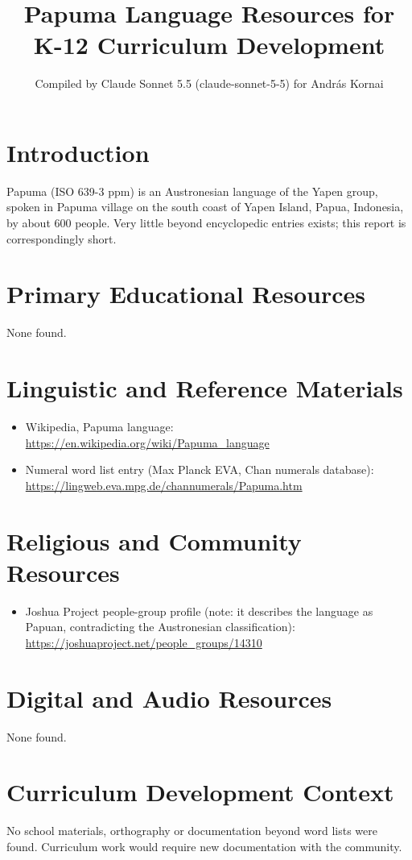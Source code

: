 \documentclass[12pt]{article}
\title{Papuma Language Resources for K-12 Curriculum Development}
\author{Compiled by Claude Sonnet 5.5 (claude-sonnet-5-5) for Andr\'as Kornai}
\date{}
\begin{document}
\maketitle

\section{Introduction}
Papuma (ISO 639-3 ppm) is an Austronesian language of the Yapen group, spoken in Papuma village on the south coast of Yapen Island, Papua, Indonesia, by about 600 people. Very little beyond encyclopedic entries exists; this report is correspondingly short.

\section{Primary Educational Resources}
None found.

\section{Linguistic and Reference Materials}
\begin{itemize}
\item Wikipedia, Papuma language: \url{https://en.wikipedia.org/wiki/Papuma_language}
\item Numeral word list entry (Max Planck EVA, Chan numerals database): \url{https://lingweb.eva.mpg.de/channumerals/Papuma.htm}
\end{itemize}

\section{Religious and Community Resources}
\begin{itemize}
\item Joshua Project people-group profile (note: it describes the language as Papuan, contradicting the Austronesian classification): \url{https://joshuaproject.net/people_groups/14310}
\end{itemize}

\section{Digital and Audio Resources}
None found.

\section{Curriculum Development Context}
No school materials, orthography or documentation beyond word lists were found. Curriculum work would require new documentation with the community.
\end{document}
